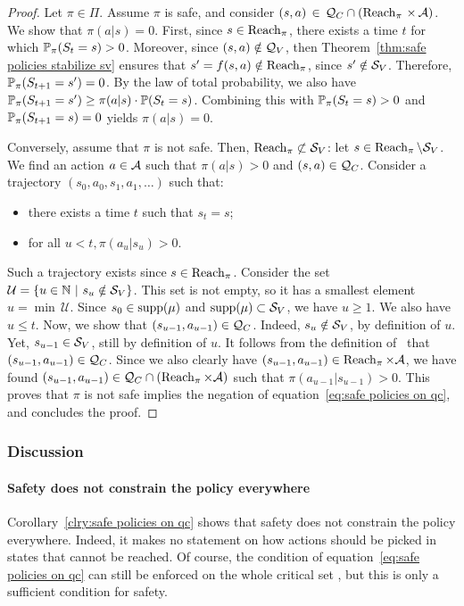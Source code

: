 \begin{proof}
	Let $\pi\in\Pi$. Assume $\pi$ is safe, and consider $(s, a)\,\in\, \QC \cap (\reach_\pi\,\times\,\A)$. We show that $\pi(a|s) = 0$. First, since $s\in\reach_\pi$, there exists a time $t$ for which $\P_\pi(S_t = s) > 0$. Moreover, since $(s, a) \notin \QV$, then Theorem~\ref{thm:safe policies stabilize sv} ensures that $s' = f(s, a)\notin\reach_\pi$, since $s'\notin\SV$. Therefore, $\P_\pi(S_{t+1} = s') = 0$. By the law of total probability, we also have $\P_\pi(S_{t+1} = s') \geq \pi(a|s)\cdot\P(S_t = s)$. Combining this with $\P_\pi(S_t = s) > 0$ and $\P_\pi(S_{t+1} = s) = 0$ yields $\pi(a|s) = 0$.\par
	Conversely, assume that $\pi$ is not safe. Then, $\reach_\pi\not\subset\SV$: let $s\in\reach_\pi\setminus\SV$. We find an action $a\in\A$ such that $\pi(a|s) > 0$ and $(s, a) \in \QC$. Consider a trajectory $(s_0, a_0, s_1, a_1, \hdots)$ such that:
	\begin{itemize}
		\item there exists a time $t$ such that $s_t = s$;
		\item for all $u < t, \pi(a_u|s_u) > 0$.
	\end{itemize}
	Such a trajectory exists since $s\in\reach_\pi$. Consider the set \mbox{$\mathcal{U} = \{u\in\mathbb{N}~|~s_u\notin\SV\}$}. This set is not empty, so it has a smallest element $u = \min\,\mathcal{U}$. Since $s_0\in\support(\mu)$ and $\support(\mu)\subset\SV$, we have $u \geq 1$. We also have $u\leq t$. Now, we show that $(s_{u-1}, a_{u-1}) \in \QC$. Indeed, $s_u\notin\SV$, by definition of $u$. Yet, $s_{u-1}\in\SV$, still by definition of $u$. It follows from the definition of \QC~that $(s_{u-1}, a_{u-1})\in\QC$. Since we also clearly have $(s_{u-1}, a_{u-1})\in\reach_\pi \times \A$, we have found $(s_{u-1}, a_{u-1}) \in \QC\cap(\reach_\pi \times \A)$ such that $\pi(a_{u-1}|s_{u-1}) > 0$. This proves that $\pi$ is not safe implies the negation of equation~\eqref{eq:safe policies on qc}, and concludes the proof.
\end{proof}
\subsubsection{Discussion}
\paragraph{Safety does not constrain the policy everywhere} Corollary~\ref{clry:safe policies on qc} shows that safety does not constrain the policy everywhere. Indeed, it makes no statement on how actions should be picked in states that cannot be reached. Of course, the condition of equation~\eqref{eq:safe policies on qc} can still be enforced on the whole critical set \QC, but this is only a sufficient condition for safety.

